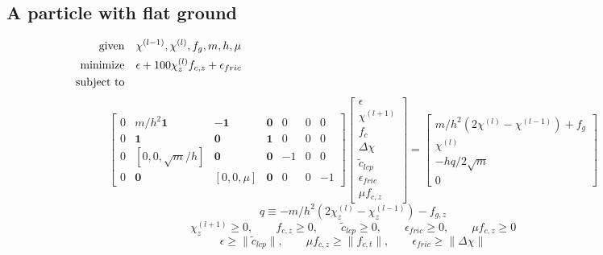 \documentclass[a4paper,10pt]{article}
\begin{document}
\subsection{A particle with flat ground}
\begin{align}
\text{given}      & \quad \chi^{(l-1)}, \chi^{(l)}, f_g, m, h, \mu\notag\\
\text{minimize}   & \quad \epsilon + 100\chi^{(l)}_z f_{c,z} + \epsilon_{fric} \notag\\
\text{subject to} & \quad\quad\quad\quad\quad\quad\quad\quad\quad\quad\quad\quad\quad\quad\quad
\quad\quad\quad\quad\quad\quad\quad\quad\quad\quad\quad\quad\quad\quad\quad
\quad\quad\quad\quad\quad\quad\quad\quad\quad\quad\quad\quad\quad\quad\quad \notag
\end{align}
\begin{equation}
\left[\begin{array}{ccccccc}
0 & m/h^2\mathbf{1}     & -\mathbf{1}  & \mathbf{0} & 0 & 0 & 0 \\
0 &    \mathbf{1}       & \mathbf{0}   & \mathbf{1} & 0 & 0 & 0 \\
0 & [ 0, 0, \sqrt{m}/h] & \mathbf{0}   & \mathbf{0} & -1 & 0 & 0 \\
0 & \mathbf{0}          & [ 0, 0, \mu] & \mathbf{0} & 0 & 0 & -1
\end{array}\right]
\left[\begin{array}{c}
\epsilon \\ \chi^{(l+1)} \\ f_c \\ \Delta\chi \\ \tilde{c}_{lcp} \\ \epsilon_{fric} \\ \mu f_{c,z}
\end{array}\right]
=
\left[\begin{array}{c}
m/h^2(2\chi^{(l)}-\chi^{(l-1)}) + f_g \\
\chi^{(l)} \\
-hq/2\sqrt{m} \\
0
\end{array}\right]
\end{equation}
\begin{equation}
q \equiv -m/h^2(2\chi^{(l)}_z-\chi^{(l-1)}_z)-f_{g,z}
\end{equation}
\begin{equation}
\chi^{(l+1)}_z \geq 0       , \quad\quad
f_{c,z} \geq 0              , \quad\quad
\tilde{c}_{lcp} \geq 0          , \quad\quad
\epsilon_{fric} \geq 0          , \quad\quad
\mu f_{c,z} \geq 0
\end{equation}
\begin{equation}
\epsilon            \geq \| \tilde{c}_{lcp} \| , \quad\quad
\mu f_{c,z}  \geq \| f_{c,t}         \| , \quad\quad
\epsilon_{fric}    \geq \| \Delta\chi      \| 
\end{equation}
\end{document}
